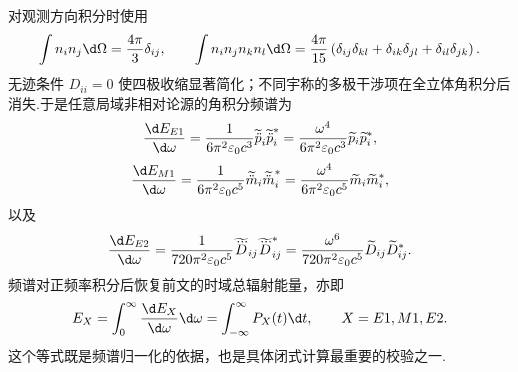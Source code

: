对观测方向积分时使用
\begin{equation}
 \int n_i n_j\d\Omega=\frac{4\pi}{3}\delta_{ij},
 \qquad
 \int n_i n_jn_kn_l\d\Omega
 =\frac{4\pi}{15}
 \left(\delta_{ij}\delta_{kl}+\delta_{ik}\delta_{jl}+\delta_{il}\delta_{jk}\right).
 \label{eq:angular-tensor-integrals-spectrum}
\end{equation}
无迹条件 $D_{ii}=0$ 使四极收缩显著简化；不同宇称的多极干涉项在全立体角积分后消失.于是任意局域非相对论源的角积分频谱为
\begin{equation}
 \frac{\d E_{E1}}{\d\omega}
 =\frac{1}{6\pi^2\varepsilon_0c^3}
 \widetilde{\ddot p}_i\widetilde{\ddot p}_i^*
 =\frac{\omega^4}{6\pi^2\varepsilon_0c^3}
 \widetilde p_i\widetilde p_i^*,
 \label{eq:E1-frequency-general}
\end{equation}
\begin{equation}
 \frac{\d E_{M1}}{\d\omega}
 =\frac{1}{6\pi^2\varepsilon_0c^5}
 \widetilde{\ddot m}_i\widetilde{\ddot m}_i^*
 =\frac{\omega^4}{6\pi^2\varepsilon_0c^5}
 \widetilde m_i\widetilde m_i^*,
 \label{eq:M1-frequency-general}
\end{equation}
以及
\begin{equation}
 \frac{\d E_{E2}}{\d\omega}
 =\frac{1}{720\pi^2\varepsilon_0c^5}
 \widetilde{\dddot D}_{ij}\widetilde{\dddot D}_{ij}^*
 =\frac{\omega^6}{720\pi^2\varepsilon_0c^5}
 \widetilde D_{ij}\widetilde D_{ij}^*.
 \label{eq:E2-frequency-general}
\end{equation}
频谱对正频率积分后恢复前文的时域总辐射能量，亦即
\begin{equation}
 E_{X}=\int_0^\infty\frac{\d E_X}{\d\omega}\d\omega
 =\int_{-\infty}^{\infty}P_X(t)\d t,
 \qquad X=E1,M1,E2.
 \label{eq:spectrum-time-domain-consistency}
\end{equation}
这个等式既是频谱归一化的依据，也是具体闭式计算最重要的校验之一.

